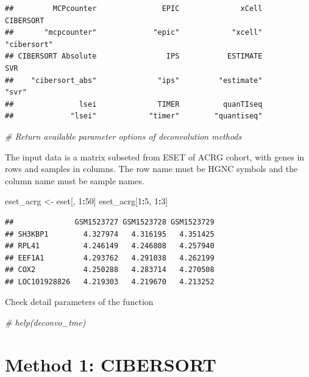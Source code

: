 \documentclass[
  12pt,
]{book}
\newenvironment{Shaded}{\begin{snugshade}}{\end{snugshade}}
\newcommand{\CommentTok}[1]{\textcolor[rgb]{0.56,0.35,0.01}{\textit{#1}}}
\newcommand{\DecValTok}[1]{\textcolor[rgb]{0.00,0.00,0.81}{#1}}
\newcommand{\NormalTok}[1]{#1}
\newcommand{\OtherTok}[1]{\textcolor[rgb]{0.56,0.35,0.01}{#1}}
\newcommand{\SpecialCharTok}[1]{\textcolor[rgb]{0.81,0.36,0.00}{\textbf{#1}}}
\begin{document}
\begin{verbatim}
##         MCPcounter               EPIC              xCell          CIBERSORT 
##       "mcpcounter"             "epic"            "xcell"        "cibersort" 
## CIBERSORT Absolute                IPS           ESTIMATE                SVR 
##    "cibersort_abs"              "ips"         "estimate"              "svr" 
##               lsei              TIMER          quanTIseq 
##             "lsei"            "timer"        "quantiseq"
\end{verbatim}

\begin{Shaded}
\begin{Highlighting}[]
\CommentTok{\# Return available parameter options of deconvolution methods}
\end{Highlighting}
\end{Shaded}

The input data is a matrix subseted from ESET of ACRG cohort, with genes in rows and samples in columns. The row name must be HGNC symbols and the column name must be sample names.

\begin{Shaded}
\begin{Highlighting}[]
\NormalTok{eset\_acrg }\OtherTok{\textless{}{-}}\NormalTok{ eset[, }\DecValTok{1}\SpecialCharTok{:}\DecValTok{50}\NormalTok{]}
\NormalTok{eset\_acrg[}\DecValTok{1}\SpecialCharTok{:}\DecValTok{5}\NormalTok{, }\DecValTok{1}\SpecialCharTok{:}\DecValTok{3}\NormalTok{]}
\end{Highlighting}
\end{Shaded}

\begin{verbatim}
##              GSM1523727 GSM1523728 GSM1523729
## SH3KBP1        4.327974   4.316195   4.351425
## RPL41          4.246149   4.246808   4.257940
## EEF1A1         4.293762   4.291038   4.262199
## COX2           4.250288   4.283714   4.270508
## LOC101928826   4.219303   4.219670   4.213252
\end{verbatim}

Check detail parameters of the function

\begin{Shaded}
\begin{Highlighting}[]
\CommentTok{\# help(deconvo\_tme)}
\end{Highlighting}
\end{Shaded}

\hypertarget{method-1-cibersort}{%
\section{Method 1: CIBERSORT}\label{method-1-cibersort}}
\end{document}
